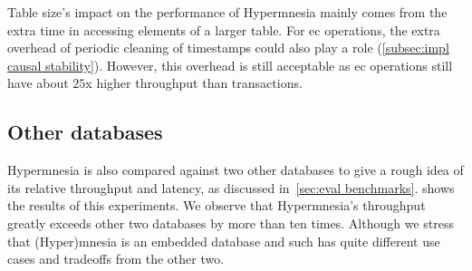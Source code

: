 Table size's impact on the performance of Hypermnesia mainly comes from the
extra time in accessing elements of a larger table. For \acrshort{ec} operations,
the extra overhead of periodic cleaning of timestamps could also play a 
role (\cref{subsec:impl causal stability}). However, this overhead 
is still acceptable as \acrshort{ec}
operations still have about \(25\)x higher throughput than transactions.

\subsection{Other databases} \label{subsec:eval other db}

Hypermnesia is also compared against two other databases to give a rough idea of its
relative throughput and latency, as discussed in~\cref{sec:eval benchmarks}. 
shows the results of this experiments. We observe that Hypermnesia's throughput greatly
exceeds other two databases by more than ten times. Although we stress that (Hyper)mnesia
is an embedded database and such has quite different use cases and tradeoffs from the
other two.

